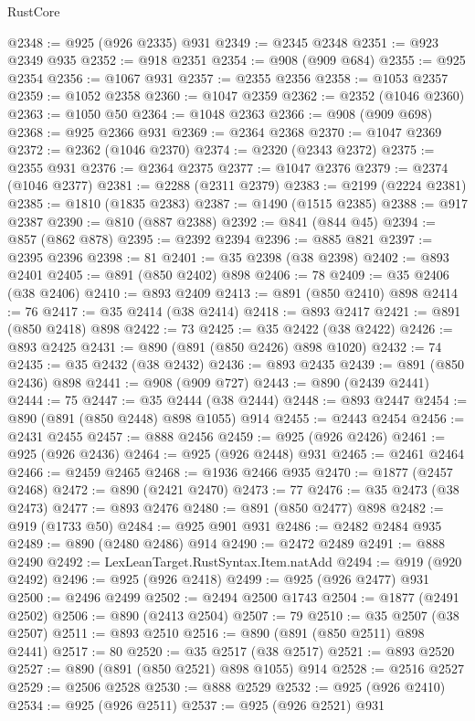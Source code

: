 \begin{lexlean}{RustCore}
\begin{coremodule}
@2348 := @925 (@926 @2335) @931
@2349 := @2345 @2348
@2351 := @923 @2349 @935
@2352 := @918 @2351
@2354 := @908 (@909 @684)
@2355 := @925 @2354
@2356 := @1067 @931
@2357 := @2355 @2356
@2358 := @1053 @2357
@2359 := @1052 @2358
@2360 := @1047 @2359
@2362 := @2352 (@1046 @2360)
@2363 := @1050 @50
@2364 := @1048 @2363
@2366 := @908 (@909 @698)
@2368 := @925 @2366 @931
@2369 := @2364 @2368
@2370 := @1047 @2369
@2372 := @2362 (@1046 @2370)
@2374 := @2320 (@2343 @2372)
@2375 := @2355 @931
@2376 := @2364 @2375
@2377 := @1047 @2376
@2379 := @2374 (@1046 @2377)
@2381 := @2288 (@2311 @2379)
@2383 := @2199 (@2224 @2381)
@2385 := @1810 (@1835 @2383)
@2387 := @1490 (@1515 @2385)
@2388 := @917 @2387
@2390 := @810 (@887 @2388)
@2392 := @841 (@844 @45)
@2394 := @857 (@862 @878)
@2395 := @2392 @2394
@2396 := @885 @821
@2397 := @2395 @2396
@2398 := 81
@2401 := @35 @2398 (@38 @2398)
@2402 := @893 @2401
@2405 := @891 (@850 @2402) @898
@2406 := 78
@2409 := @35 @2406 (@38 @2406)
@2410 := @893 @2409
@2413 := @891 (@850 @2410) @898
@2414 := 76
@2417 := @35 @2414 (@38 @2414)
@2418 := @893 @2417
@2421 := @891 (@850 @2418) @898
@2422 := 73
@2425 := @35 @2422 (@38 @2422)
@2426 := @893 @2425
@2431 := @890 (@891 (@850 @2426) @898 @1020)
@2432 := 74
@2435 := @35 @2432 (@38 @2432)
@2436 := @893 @2435
@2439 := @891 (@850 @2436) @898
@2441 := @908 (@909 @727)
@2443 := @890 (@2439 @2441)
@2444 := 75
@2447 := @35 @2444 (@38 @2444)
@2448 := @893 @2447
@2454 := @890 (@891 (@850 @2448) @898 @1055) @914
@2455 := @2443 @2454
@2456 := @2431 @2455
@2457 := @888 @2456
@2459 := @925 (@926 @2426)
@2461 := @925 (@926 @2436)
@2464 := @925 (@926 @2448) @931
@2465 := @2461 @2464
@2466 := @2459 @2465
@2468 := @1936 @2466 @935
@2470 := @1877 (@2457 @2468)
@2472 := @890 (@2421 @2470)
@2473 := 77
@2476 := @35 @2473 (@38 @2473)
@2477 := @893 @2476
@2480 := @891 (@850 @2477) @898
@2482 := @919 (@1733 @50)
@2484 := @925 @901 @931
@2486 := @2482 @2484 @935
@2489 := @890 (@2480 @2486) @914
@2490 := @2472 @2489
@2491 := @888 @2490
@2492 := LexLeanTarget.RustSyntax.Item.natAdd
@2494 := @919 (@920 @2492)
@2496 := @925 (@926 @2418)
@2499 := @925 (@926 @2477) @931
@2500 := @2496 @2499
@2502 := @2494 @2500 @1743
@2504 := @1877 (@2491 @2502)
@2506 := @890 (@2413 @2504)
@2507 := 79
@2510 := @35 @2507 (@38 @2507)
@2511 := @893 @2510
@2516 := @890 (@891 (@850 @2511) @898 @2441)
@2517 := 80
@2520 := @35 @2517 (@38 @2517)
@2521 := @893 @2520
@2527 := @890 (@891 (@850 @2521) @898 @1055) @914
@2528 := @2516 @2527
@2529 := @2506 @2528
@2530 := @888 @2529
@2532 := @925 (@926 @2410)
@2534 := @925 (@926 @2511)
@2537 := @925 (@926 @2521) @931

\end{coremodule}
\end{lexlean}
